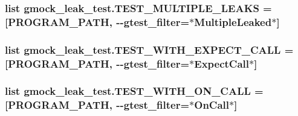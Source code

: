 \subsubsection[{\texorpdfstring{T\+E\+S\+T\+\_\+\+M\+U\+L\+T\+I\+P\+L\+E\+\_\+\+L\+E\+A\+KS}{TEST_MULTIPLE_LEAKS}}]{\setlength{\rightskip}{0pt plus 5cm}list gmock\+\_\+leak\+\_\+test.\+T\+E\+S\+T\+\_\+\+M\+U\+L\+T\+I\+P\+L\+E\+\_\+\+L\+E\+A\+KS = \mbox{[}{\bf P\+R\+O\+G\+R\+A\+M\+\_\+\+P\+A\+TH}, \textquotesingle{}-\/-\/gtest\+\_\+filter=$\ast$Multiple\+Leaked$\ast$\textquotesingle{}\mbox{]}}\hypertarget{namespacegmock__leak__test_a9a529935171ee6ab369902d9a77ffbf5}{}\label{namespacegmock__leak__test_a9a529935171ee6ab369902d9a77ffbf5}
\subsubsection[{\texorpdfstring{T\+E\+S\+T\+\_\+\+W\+I\+T\+H\+\_\+\+E\+X\+P\+E\+C\+T\+\_\+\+C\+A\+LL}{TEST_WITH_EXPECT_CALL}}]{\setlength{\rightskip}{0pt plus 5cm}list gmock\+\_\+leak\+\_\+test.\+T\+E\+S\+T\+\_\+\+W\+I\+T\+H\+\_\+\+E\+X\+P\+E\+C\+T\+\_\+\+C\+A\+LL = \mbox{[}{\bf P\+R\+O\+G\+R\+A\+M\+\_\+\+P\+A\+TH}, \textquotesingle{}-\/-\/gtest\+\_\+filter=$\ast$Expect\+Call$\ast$\textquotesingle{}\mbox{]}}\hypertarget{namespacegmock__leak__test_aa03214d2fad1ee0fd3f3101da688ebfc}{}\label{namespacegmock__leak__test_aa03214d2fad1ee0fd3f3101da688ebfc}
\subsubsection[{\texorpdfstring{T\+E\+S\+T\+\_\+\+W\+I\+T\+H\+\_\+\+O\+N\+\_\+\+C\+A\+LL}{TEST_WITH_ON_CALL}}]{\setlength{\rightskip}{0pt plus 5cm}list gmock\+\_\+leak\+\_\+test.\+T\+E\+S\+T\+\_\+\+W\+I\+T\+H\+\_\+\+O\+N\+\_\+\+C\+A\+LL = \mbox{[}{\bf P\+R\+O\+G\+R\+A\+M\+\_\+\+P\+A\+TH}, \textquotesingle{}-\/-\/gtest\+\_\+filter=$\ast$On\+Call$\ast$\textquotesingle{}\mbox{]}}\hypertarget{namespacegmock__leak__test_a5b7e5890b4022a37ef82bdf4eb22ef44}{}\label{namespacegmock__leak__test_a5b7e5890b4022a37ef82bdf4eb22ef44}
